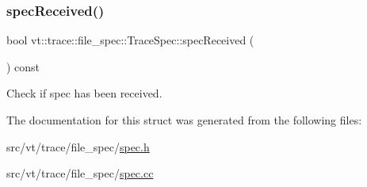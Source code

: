 \subsubsection{\texorpdfstring{spec\+Received()}{specReceived()}}
{\footnotesize\ttfamily bool vt\+::trace\+::file\+\_\+spec\+::\+Trace\+Spec\+::spec\+Received (\begin{DoxyParamCaption}{ }\end{DoxyParamCaption}) const\hspace{0.3cm}{\ttfamily [inline]}}



Check if spec has been received. 



The documentation for this struct was generated from the following files\+:\begin{DoxyCompactItemize}
\item 
src/vt/trace/file\+\_\+spec/\hyperlink{spec_8h}{spec.\+h}\item 
src/vt/trace/file\+\_\+spec/\hyperlink{spec_8cc}{spec.\+cc}\end{DoxyCompactItemize}
